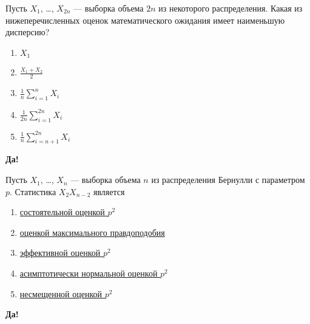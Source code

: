\documentclass[t]{beamer}
\begin{document}
 \begin{frame} \label{5-Yes} 
\begin{block}{5} 

Пусть $X_1$, \ldots, $X_{2 n}$ — выборка объема $2 n$ из некоторого распределения. Какая из нижеперечисленных оценок математического ожидания имеет наименьшую дисперсию?
 


 \end{block} 
\begin{enumerate} 
\item[] \hyperlink{5-No}{\beamergotobutton{} $X_1$}
\item[] \hyperlink{5-No}{\beamergotobutton{} $\frac{X_1+X_2}{2}$}
\item[] \hyperlink{5-No}{\beamergotobutton{} $\frac{1}{n} \sum_{i=1}^n X_i$}
\item[] \hyperlink{5-Yes}{\beamergotobutton{} $\frac{1}{2 n} \sum_{i=1}^{2 n} X_i$}
\item[] \hyperlink{5-No}{\beamergotobutton{} $\frac{1}{n} \sum_{i=n+1}^{2 n} X_i$}
\end{enumerate} 

 \textbf{Да!} 
 \hyperlink{6}{}\end{frame} 


 \begin{frame} \label{6-Yes} 
\begin{block}{6} 

Пусть $X_1$, \ldots, $X_n$ — выборка объема $n$ из распределения Бернулли с параметром $p$. Статистика $X_2 X_{n-2}$ является
 


 \end{block} 
\begin{enumerate} 
\item[] \hyperlink{6-No}{\beamergotobutton{} состоятельной оценкой $p^2$}
\item[] \hyperlink{6-No}{\beamergotobutton{} оценкой максимального правдоподобия}
\item[] \hyperlink{6-No}{\beamergotobutton{} эффективной оценкой $p^2$}
\item[] \hyperlink{6-No}{\beamergotobutton{} асимптотически нормальной оценкой $p^2$}
\item[] \hyperlink{6-Yes}{\beamergotobutton{} несмещенной оценкой $p^2$}
\end{enumerate} 

 \textbf{Да!} 
 \hyperlink{7}{}\end{frame} 
\end{document}
